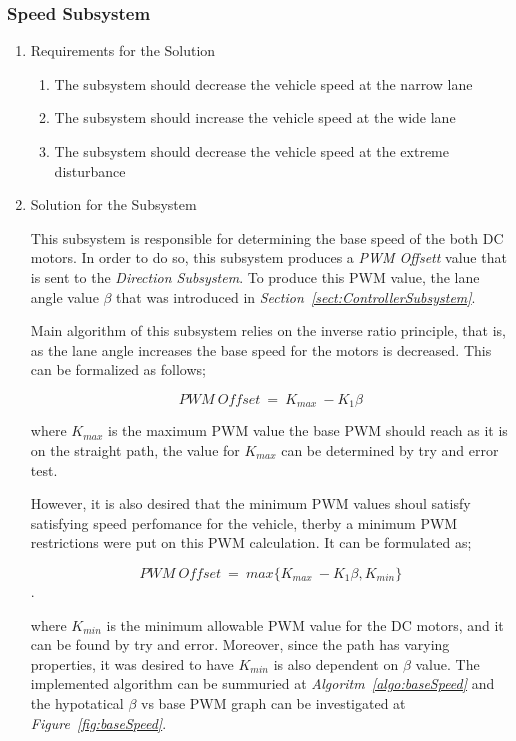 \documentclass[a4paper,12pt]{article}
\begin{document}
\subsubsection{Speed Subsystem}

	\begin{enumerate}
	\item {Requirements for the Solution}
	
	\begin{enumerate}
		\item The subsystem should decrease the vehicle speed at the narrow lane 
		\item The subsystem should increase the vehicle speed at the wide lane
		\item The subsystem should decrease the vehicle speed at the extreme disturbance  
	\end{enumerate}

	\item {Solution for the Subsystem}

		This subsystem is responsible for determining the base speed of the both DC motors. In order to do so, this subsystem produces a \textit{PWM Offsett} value that is sent to the \textit{Direction Subsystem}. To produce this PWM value, the lane angle value $\beta$ that was introduced in \textit{Section~\ref{sect:ControllerSubsystem}}.

		Main algorithm of this subsystem relies on the inverse ratio principle, that is, as the lane angle increases the base speed for the motors is decreased. This can be formalized as follows;
		
		$$ PWM~Offset~=~K_{max}~-K_1 \beta$$
		
		where $K_{max}$ is the maximum PWM value the base PWM should reach as it is on the straight path, the value for $K_{max}$ can be determined by try and error test.
		
		However, it is also desired that the minimum PWM values shoul satisfy satisfying speed perfomance for the vehicle, therby a minimum PWM restrictions were put on this PWM calculation. It can be formulated as;
		
		$$ PWM~Offset~=~max\{ K_{max}~-K_1 \beta , K_{min} \}$$.
		
		where $K_{min}$ is the minimum allowable PWM value for the DC motors, and it can be found by try and error.	Moreover, since the path has varying properties, it was desired to have $K_{min}$ is also dependent on $\beta$ value. The implemented algorithm can be summuried at \textit{Algoritm~\ref{algo:baseSpeed}} and the hypotatical $\beta$ vs base PWM graph can be investigated at \textit{Figure~\ref{fig:baseSpeed}}.
		

\end{enumerate}
\end{document}
